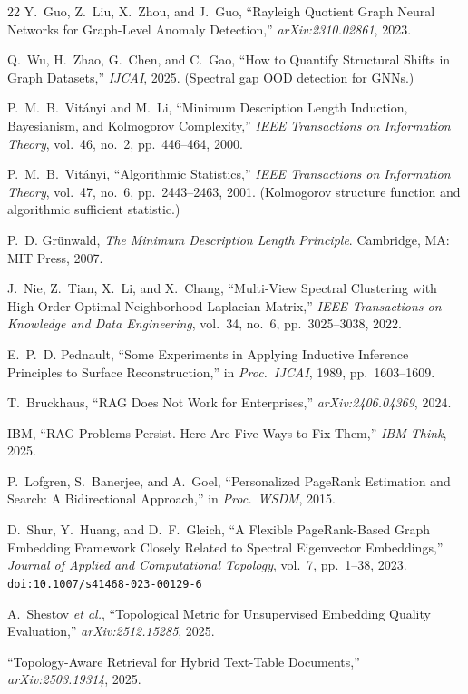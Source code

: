 \documentclass[12pt,a4paper]{article}
\theoremstyle{plain}
\theoremstyle{definition}
\theoremstyle{remark}
\newcommand{\1}{\mathbf{1}}
\begin{document}
\begin{thebibliography}{22}
		Y.~Guo, Z.~Liu, X.~Zhou, and J.~Guo,
		``Rayleigh Quotient Graph Neural Networks for Graph-Level Anomaly
		Detection,''
		\emph{arXiv:2310.02861}, 2023.
		
		Q.~Wu, H.~Zhao, G.~Chen, and C.~Gao,
		``How to Quantify Structural Shifts in Graph Datasets,''
		\emph{IJCAI}, 2025.
		\newblock (Spectral gap OOD detection for GNNs.)
		
		P.~M.~B.~Vit\'anyi and M.~Li,
		``Minimum Description Length Induction, Bayesianism, and
		Kolmogorov Complexity,''
		\emph{IEEE Transactions on Information Theory},
		vol.~46, no.~2, pp.~446--464, 2000.
		
		P.~M.~B.~Vit\'anyi,
		``Algorithmic Statistics,''
		\emph{IEEE Transactions on Information Theory},
		vol.~47, no.~6, pp.~2443--2463, 2001.
		\newblock (Kolmogorov structure function and algorithmic sufficient statistic.)
		
		P.~D. Gr\"unwald,
		\emph{The Minimum Description Length Principle}.
		Cambridge, MA: MIT Press, 2007.
		
		J.~Nie, Z.~Tian, X.~Li, and X.~Chang,
		``Multi-View Spectral Clustering with High-Order Optimal Neighborhood
		Laplacian Matrix,''
		\emph{IEEE Transactions on Knowledge and Data Engineering},
		vol.~34, no.~6, pp.~3025--3038, 2022.
		
		E.~P.~D. Pednault,
		``Some Experiments in Applying Inductive Inference Principles to
		Surface Reconstruction,''
		in \emph{Proc.\ IJCAI}, 1989, pp.~1603--1609.
		
		T.~Bruckhaus,
		``RAG Does Not Work for Enterprises,''
		\emph{arXiv:2406.04369}, 2024.
		
		IBM,
		``RAG Problems Persist. Here Are Five Ways to Fix Them,''
		\emph{IBM Think}, 2025.
		
		P.~Lofgren, S.~Banerjee, and A.~Goel,
		``Personalized PageRank Estimation and Search: A Bidirectional Approach,''
		in \emph{Proc.\ WSDM}, 2015.
		
		D.~Shur, Y.~Huang, and D.~F.~Gleich,
		``A Flexible PageRank-Based Graph Embedding Framework Closely Related to
		Spectral Eigenvector Embeddings,''
		\emph{Journal of Applied and Computational Topology},
		vol.~7, pp.~1--38, 2023.
		\newblock \texttt{doi:10.1007/s41468-023-00129-6}
		
		A.~Shestov \emph{et al.},
		``Topological Metric for Unsupervised Embedding Quality Evaluation,''
		\emph{arXiv:2512.15285}, 2025.
		
		``Topology-Aware Retrieval for Hybrid Text-Table Documents,''
		\emph{arXiv:2503.19314}, 2025.
		
	\end{thebibliography}
	
\end{document}
